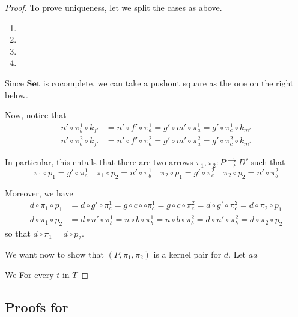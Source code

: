 \documentclass[a4paper,UKenglish,cleveref,pdftex,thm-restate,numberwithinsect]{lipics-v2021}
\newcommand{\Set}{\mathbf{Set}}
\begin{document}
\begin{proof}
	
	To prove uniqueness, let we split the cases as above.
	\begin{enumerate}
		\item 
		\item 
		\item 
		\item \qedhere
	\end{enumerate}
	
	Since $\Set$ is cocomplete, we can take a pushout square as the one  on the right below. 
	
	\parbox{10.5cm}{Now, notice that \begin{align*}
		n'\circ \pi^1_{b}\circ k_{f'}&=n'\circ f'\circ \pi^1_{a}=g'\circ m'\circ \pi^1_{a}=g'\circ \pi^{1}_{c}\circ k_{m'}\\
		n'\circ \pi^2_{b}\circ k_{f'}&=n'\circ f'\circ \pi^2_{a}=g'\circ m'\circ \pi^2_{a}=g'\circ \pi^{2}_{c}\circ k_{m'}
		\end{align*}}\hfill \parbox{2cm}{}
	
	In particular, this entails that there are two arrows $\pi_1, \pi_2\colon P\rightrightarrows D'$ such that 
	\[\pi_1\circ p_1=g'\circ \pi^1_c \quad \pi_1\circ p_2=n'\circ \pi^1_b \quad \pi_2\circ p_1=g'\circ \pi^2_c \quad \pi_2\circ p_2=n'\circ \pi^2_b\]
 
 Moreover,  we have
 \begin{align*}
 	d\circ \pi_1\circ p_1&=d\circ g'\circ \pi^1_c=g\circ c\circ \circ \pi^1_c=g\circ c\circ \pi^2_c=d\circ g'\circ \pi^2_c=d\circ \pi_2 \circ p_1\\
 	d\circ \pi_1\circ p_2&=d\circ n'\circ \pi^1_b=n\circ b \circ \pi^1_b=n\circ b\circ \pi^2_b=d\circ n'\circ \pi^2_b=d\circ \pi_2 \circ p_2
 \end{align*}
	so that $d\circ \pi_1=d\circ p_2$.
	
	We want now to show that $(P, \pi_1, \pi_2)$ is a kernel pair for $d$. Let $aa$


We 
For every $t$ in $T$
	
	
\end{proof}


\subsection{Proofs for }\label{app:due}
\fhyp*
\end{document}
